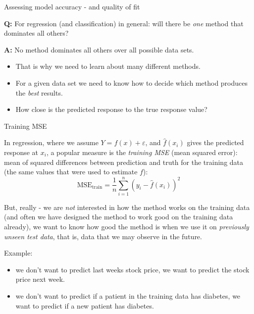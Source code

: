 \documentclass[ignorenonframetext,]{beamer}
\providecommand{\tightlist}{%
  \setlength{\itemsep}{0pt}\setlength{\parskip}{0pt}}
\begin{document}
\begin{frame}

\begin{block}{Assessing model accuracy - and quality of fit}

\textbf{Q:} For regression (and classification) in general: will there
be \emph{one} method that dominates all others?

\textbf{A:} No method dominates all others over all possible data sets.

\begin{itemize}
\tightlist
\item
  That is why we need to learn about many different methods.
\item
  For a given data set we need to know how to decide which method
  produces the \emph{best} results.
\item
  How close is the predicted response to the true response value?
\end{itemize}

\end{block}

\end{frame}

\begin{frame}

\begin{block}{Training MSE}

In regression, where we assume \(Y = f(x) + \varepsilon\), and
\(\hat{f}(x_i)\) gives the predicted response at \(x_i\), a popular
measure is the \emph{training MSE} (mean squared error): mean of squared
differences between prediction and truth for the training data (the same
values that were used to estimate \(f\)):
\[ \text{MSE}_{\text{train}}=\frac{1}{n}\sum_{i=1}^n (y_i-\hat{f}(x_i))^2\]

But, really - we are \emph{not} interested in how the method works on
the training data (and often we have designed the method to work good on
the training data already), we want to know how good the method is when
we use it on \emph{previously unseen test data}, that is, data that we
may observe in the future.

\end{block}

\end{frame}

\begin{frame}

Example:

\begin{itemize}
\tightlist
\item
  we don't want to predict last weeks stock price, we want to predict
  the stock price next week.
\item
  we don't want to predict if a patient in the training data has
  diabetes, we want to predict if a new patient has diabetes.
\end{itemize}

\end{frame}
\end{document}
